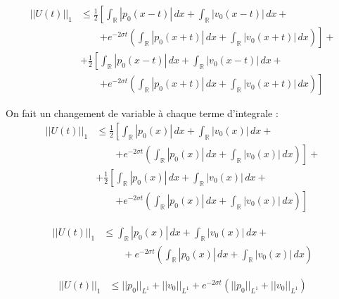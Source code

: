 \documentclass[a4paper,11pt]{article}
\begin{document}
\begin{equation*}
\begin{split}
    ||U(t)||_1 & \le \frac{1}{2} \left[\int_{\mathbb{R}}|p_0(x-t)| \,dx + \int_{\mathbb{R}} |v_0(x-t)| \,dx + \right. \\
   & \qquad \left. + e^{-2\sigma t} \left( \int_{\mathbb{R}} |p_0(x+t)| \,dx + \int_{\mathbb{R}} |v_0(x+t)| \,dx \right) \right] + \\
   & + \frac{1}{2} \left[ \int_{\mathbb{R}}|p_0(x-t)| \,dx + \int_{\mathbb{R}} |v_0(x-t)| \,dx + \right. \\
   & \qquad \left. + e^{-2\sigma t} \left( \int_{\mathbb{R}} |p_0(x+t)| \,dx + \int_{\mathbb{R}} |v_0(x+t)| \,dx \right) \right]
\end{split}
\end{equation*}

On fait un changement de variable à chaque terme d'integrale :
\begin{equation*}
\begin{split}
    ||U(t)||_1 & \le \frac{1}{2} \left[\int_{\mathbb{R}}|p_0(x)| \,dx + \int_{\mathbb{R}} |v_0(x)| \,dx + \right. \\
   & \qquad \left. + e^{-2\sigma t} \left(\int_{\mathbb{R}} |p_0(x)| \,dx + \int_{\mathbb{R}} |v_0(x)| \,dx \right) \right] + \\
   & + \frac{1}{2} \left[ \int_{\mathbb{R}}|p_0(x)| \,dx + \int_{\mathbb{R}} |v_0(x)| \,dx + \right. \\
   & \qquad \left. + e^{-2\sigma t} \left(\int_{\mathbb{R}} |p_0(x)| \,dx + \int_{\mathbb{R}} |v_0(x)| \,dx \right) \right]
\end{split}
\end{equation*}

\begin{equation*}
\begin{split}
    ||U(t)||_1 & \le \int_{\mathbb{R}}|p_0(x)| \,dx + \int_{\mathbb{R}} |v_0(x)| \,dx + \\
   & \qquad + e^{-2\sigma t} \left( \int_{\mathbb{R}} |p_0(x)| \,dx + \int_{\mathbb{R}} |v_0(x)| \,dx \right)
\end{split}
\end{equation*}

\begin{equation*}
\begin{split}
    ||U(t)||_1 & \le ||p_0||_{L^{1}} + ||v_0||_{L^{1}} 
    + e^{-2\sigma t} \left(||p_0||_{L^{1}} + ||v_0||_{L^{1}} \right)
\end{split}
\end{equation*}
\end{document}
